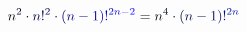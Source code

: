 \documentclass[12pt]{article}
\begin{document}
\makeatletter
\renewcommand*{\@textcolor}[3]{%
  \protect\leavevmode
  \begingroup
    \color#1{#2}#3%
  \endgroup
}
\makeatother
\begin{displaymath}
\mathcolor[RGB]{0,0,15}{n} ^ { \mathcolor[RGB]{0,0,30}{2} } \mathcolor[RGB]{0,0,45}{\cdot} \mathcolor[RGB]{0,0,60}{n} \mathcolor[RGB]{0,0,75}{!} ^ { \mathcolor[RGB]{0,0,90}{2} } \mathcolor[RGB]{0,0,105}{\cdot} \mathcolor[RGB]{0,0,120}{(} \mathcolor[RGB]{0,0,135}{n} \mathcolor[RGB]{0,0,150}{-} \mathcolor[RGB]{0,0,165}{1} \mathcolor[RGB]{0,0,180}{)} \mathcolor[RGB]{0,0,195}{!} ^ { \mathcolor[RGB]{0,0,210}{2} \mathcolor[RGB]{0,0,225}{n} \mathcolor[RGB]{0,0,240}{-} \mathcolor[RGB]{0,0,255}{2} } \mathcolor[RGB]{0,15,0}{=} \mathcolor[RGB]{0,15,15}{n} ^ { \mathcolor[RGB]{0,15,30}{4} } \mathcolor[RGB]{0,15,45}{\cdot} \mathcolor[RGB]{0,15,60}{(} \mathcolor[RGB]{0,15,75}{n} \mathcolor[RGB]{0,15,90}{-} \mathcolor[RGB]{0,15,105}{1} \mathcolor[RGB]{0,15,120}{)} \mathcolor[RGB]{0,15,135}{!} ^ { \mathcolor[RGB]{0,15,150}{2} \mathcolor[RGB]{0,15,165}{n} }
\end{displaymath}
\end{document}
